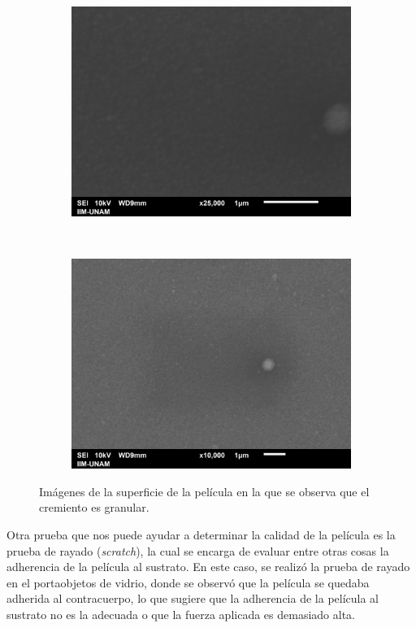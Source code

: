 \documentclass[12pt]{IEEEtran}
\begin{document}
\begin{figure}[ht]
	\centering
	\begin{subfigure}[b]{0.45\textwidth}
		\centering
		\includegraphics[width=\linewidth]{Al-sup-0001.png}
	\end{subfigure}%
	~
	\begin{subfigure}[b]{0.45\textwidth}
		\centering
		\includegraphics[width=\linewidth]{Al-sup-0002.png}
	\end{subfigure}
	\caption{Imágenes de la superficie de la película en la que se observa que el cremiento es granular.}
	\label{fig:SEM-superficie}
\end{figure}

Otra prueba que nos puede ayudar a determinar la calidad de la película es la prueba de rayado (\emph{scratch}), la cual se encarga de evaluar entre otras cosas la adherencia de la película al sustrato. En este caso, se realizó la prueba de rayado en el portaobjetos de vidrio, donde se observó que la película se quedaba adherida al contracuerpo, lo que sugiere que la adherencia de la película al sustrato no es la adecuada o que la fuerza aplicada es demasiado alta.
\end{document}
